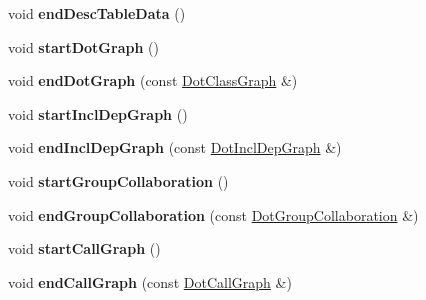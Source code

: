 \begin{DoxyCompactItemize}
\item 
\hypertarget{class_man_generator_aba60999e7c19eb5c546be43e157de98d}{void {\bfseries end\-Desc\-Table\-Data} ()}\label{class_man_generator_aba60999e7c19eb5c546be43e157de98d}

\item 
\hypertarget{class_man_generator_a3ea98cf1d0374587532fd534eb207de3}{void {\bfseries start\-Dot\-Graph} ()}\label{class_man_generator_a3ea98cf1d0374587532fd534eb207de3}

\item 
\hypertarget{class_man_generator_abb7b25f84e637dfb1f2e6aa48ed261ad}{void {\bfseries end\-Dot\-Graph} (const \hyperlink{class_dot_class_graph}{Dot\-Class\-Graph} \&)}\label{class_man_generator_abb7b25f84e637dfb1f2e6aa48ed261ad}

\item 
\hypertarget{class_man_generator_a94461be722782868a8ecb74a7fe44a35}{void {\bfseries start\-Incl\-Dep\-Graph} ()}\label{class_man_generator_a94461be722782868a8ecb74a7fe44a35}

\item 
\hypertarget{class_man_generator_ac5b96f27fcdca2efe79600038e10cfc4}{void {\bfseries end\-Incl\-Dep\-Graph} (const \hyperlink{class_dot_incl_dep_graph}{Dot\-Incl\-Dep\-Graph} \&)}\label{class_man_generator_ac5b96f27fcdca2efe79600038e10cfc4}

\item 
\hypertarget{class_man_generator_ac75e421f535cd69ad8b286bb5682f98a}{void {\bfseries start\-Group\-Collaboration} ()}\label{class_man_generator_ac75e421f535cd69ad8b286bb5682f98a}

\item 
\hypertarget{class_man_generator_ac769fd92c5888827b91589717f49bbaa}{void {\bfseries end\-Group\-Collaboration} (const \hyperlink{class_dot_group_collaboration}{Dot\-Group\-Collaboration} \&)}\label{class_man_generator_ac769fd92c5888827b91589717f49bbaa}

\item 
\hypertarget{class_man_generator_a8b9ae07c2a7ca51c0100e5258c16b663}{void {\bfseries start\-Call\-Graph} ()}\label{class_man_generator_a8b9ae07c2a7ca51c0100e5258c16b663}

\item 
\hypertarget{class_man_generator_a93d8bcfaeaaa615386cf736ad2f2259b}{void {\bfseries end\-Call\-Graph} (const \hyperlink{class_dot_call_graph}{Dot\-Call\-Graph} \&)}\label{class_man_generator_a93d8bcfaeaaa615386cf736ad2f2259b}


\end{DoxyCompactItemize}
